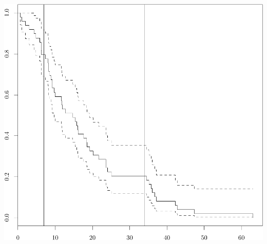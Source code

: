 \documentclass{article}\usepackage[]{graphicx}\usepackage[]{color}
\makeatletter
\def\maxwidth{ %
  \ifdim\Gin@nat@width>\linewidth
    \linewidth
  \else
    \Gin@nat@width
  \fi
}
\newenvironment{knitrout}{}{} %
\makeatother
\begin{document}
\begin{knitrout}
{\centering \includegraphics[width=\maxwidth]{figure/05-model-selection-roc-cd-2} 

}



\end{knitrout}
\end{document}
